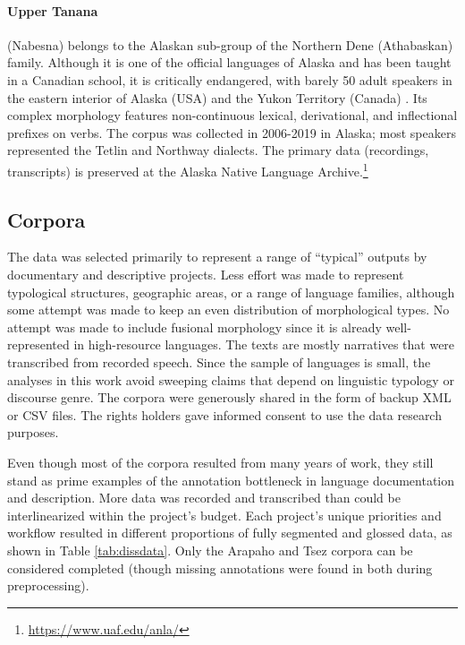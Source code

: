 \paragraph{Upper Tanana}
(Nabesna) belongs to the Alaskan sub-group of the Northern Dene (Athabaskan) family. Although it is one of the official languages of Alaska and has been taught in a Canadian school, it is critically endangered, with barely 50 adult speakers in the eastern interior of Alaska (USA) and the Yukon Territory (Canada) \citep{lovick_grammar_2020}. Its complex morphology features non-continuous lexical, derivational, and inflectional prefixes on verbs. The corpus was collected in 2006-2019 in Alaska; most speakers represented the Tetlin and Northway dialects. 
The primary data (recordings, transcripts) is preserved at the Alaska Native Language Archive.\footnote{\url{https://www.uaf.edu/anla/}}



\subsection{Corpora}


The data was selected primarily to represent a range of “typical” outputs by documentary and descriptive projects. Less effort was made to represent typological structures, geographic areas, or a range of language families, although some attempt was made to keep an even distribution of morphological types. No attempt was made to include fusional morphology since it is already well-represented in high-resource languages. The texts are mostly narratives that were transcribed from recorded speech. Since the sample of languages is small, the analyses in this work avoid sweeping claims that depend on linguistic typology or discourse genre. 
The corpora were generously shared in the form of backup XML or CSV files. The rights holders gave informed consent to use the data research purposes. 

Even though most of the corpora resulted from many years of work, they still stand as prime examples of the annotation bottleneck in language documentation and description. More data was recorded and transcribed than could be interlinearized within the project's budget. Each project's unique priorities and workflow resulted in different proportions of fully segmented and glossed data, as shown in Table \ref{tab:dissdata}.
Only the Arapaho and Tsez corpora can be considered completed (though missing annotations were found in both during preprocessing). 


